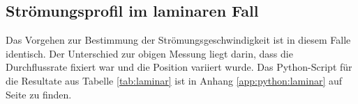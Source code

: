 \clearpage
\subsection{Str\"omungsprofil im laminaren Fall}
\label{subsec:profil:laminar}

Das  Vorgehen  zur Bestimmung  der  Str\"omungsgeschwindigkeit  ist in  diesem
Falle  identisch. Der  Unterschied  zur   obigen  Messung  liegt  darin,  dass
die  Durchflussrate   fixiert  war   und  die  Position   variiert  wurde. Das
Python-Script f\"ur die Resultate aus  Tabelle \ref{tab:laminar} ist in Anhang
\ref{app:python:laminar} auf Seite \pageref{app:python:laminar} zu finden.

